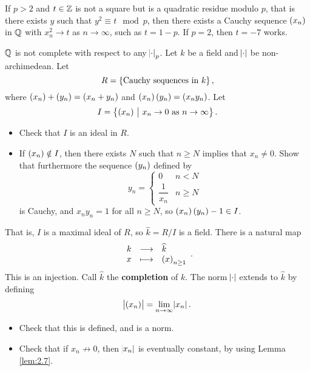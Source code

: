 \begin{exercise}
If $ p > 2 $ and $ t \in \mathbb{Z} $ is not a square but is a quadratic residue modulo $ p $, that is there exists $ y $ such that $ y^2 \equiv t \mod p $, then there exists a Cauchy sequence $ \br{x_n} $ in $ \mathbb{Q} $ with $ x_n^2 \to t $ as $ n \to \infty $, such as $ t = 1 - p $. If $ p = 2 $, then $ t = -7 $ works.
\end{exercise}


$ \mathbb{Q} $ is not complete with respect to any $ \abs{\cdot}_p $. Let $ k $ be a field and $ \abs{\cdot} $ be non-archimedean. Let
$$ R = \cbr{\text{Cauchy sequences in} \ k}, $$
where $ \br{x_n} + \br{y_n} = \br{x_n + y_n} $ and $ \br{x_n}\br{y_n} = \br{x_ny_n} $. Let
$$ I = \cbr{\br{x_n} \st x_n \to 0 \ \text{as} \ n \to \infty}. $$

\begin{exercise*}
\hfill
\begin{itemize}
\item Check that $ I $ is an ideal in $ R $.
\item If $ \br{x_n} \notin I $, then there exists $ N $ such that $ n \ge N $ implies that $ x_n \ne 0 $. Show that furthermore the sequence $ \br{y_n} $ defined by
$$ y_n =
\begin{cases}
0 & n < N \\
\dfrac{1}{x_n} & n \ge N
\end{cases}
$$
is Cauchy, and $ x_ny_n = 1 $ for all $ n \ge N $, so $ \br{x_n}\br{y_n} - 1 \in I $.
\end{itemize}
\end{exercise*}

That is, $ I $ is a maximal ideal of $ R $, so $ \widehat{k} = R / I $ is a field. There is a natural map
$$ \function{k}{\widehat{k}}{x}{\br{x}_{n \ge 1}}. $$
This is an injection. Call $ \widehat{k} $ the \textbf{completion} of $ k $. The norm $ \abs{\cdot} $ extends to $ \widehat{k} $ by defining
$$ \abs{\br{x_n}} = \lim_{n \to \infty} \abs{x_n}. $$

\begin{exercise*}
\hfill
\begin{itemize}
\item Check that this is defined, and is a norm.
\item Check that if $ x_n \not\to 0 $, then $ \abs{x_n} $ is eventually constant, by using Lemma \ref{lem:2.7}.
\end{itemize}
\end{exercise*}

